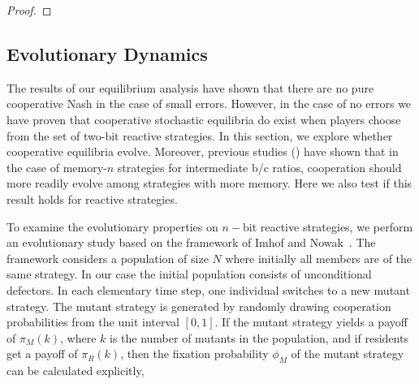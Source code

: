 \documentclass{article}
\theoremstyle{definition}
\begin{document}
\begin{proof}



\end{proof}

\subsection{Evolutionary Dynamics}\label{section:evolutionary_simulations}

The results of our equilibrium analysis have shown that there are no pure
cooperative Nash in the case of small errors. However, in the case of no errors
we have proven that cooperative stochastic equilibria do exist when players choose
from the set of two-bit reactive strategies. In this section, we explore whether
cooperative equilibria evolve. Moreover, previous studies
(\citep{hilbe:PNAS:2017}) have shown that in the case of memory-\(n\) strategies
for intermediate b/c ratios, cooperation should more readily evolve among
strategies with more memory. Here we also test if this result holds for
reactive strategies.

To examine the evolutionary properties on \(n-\)bit reactive strategies, we
perform an evolutionary study based on the framework of Imhof and
Nowak~\citep{imhof:royal:2010}. The framework considers a population of size
\(N\) where initially all members are of the same strategy. In our case the
initial population consists of unconditional defectors. In each elementary time
step, one individual switches to a new mutant strategy. The mutant strategy is
generated by randomly drawing cooperation probabilities from the unit interval
\([0,1]\). If the mutant strategy yields a payoff of \(\pi_{M}(k)\), where \(k\)
is the number of mutants in the population, and if residents get a payoff of
\(\pi_{R}(k)\), then the fixation probability \(\phi_{M}\) of the mutant
strategy can be calculated explicitly,
\end{document}
